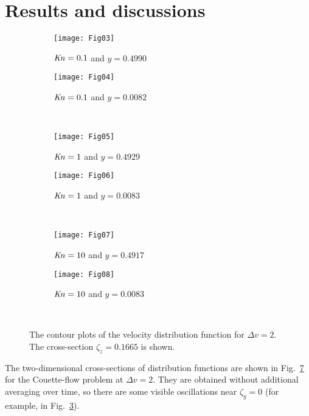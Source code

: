 \documentclass[]{jfm}
\newcommand{\Kn}{\mbox{\textit{Kn}}}
\begin{document}
\section{Results and discussions}

\begin{figure}
    \centering
    \begin{subfigure}[b]{.5\linewidth}
        \texttt{[image: Fig03]}
        \caption{\(\Kn=0.1\) and \(y=0.4990\)}
        \label{fig:distrib-kn0.1:boundary}
    \end{subfigure}%
    \begin{subfigure}[b]{.5\linewidth}
        \texttt{[image: Fig04]}
        \caption{\(\Kn=0.1\) and \(y=0.0082\)}
        \label{fig:distrib-kn0.1:center}
    \end{subfigure}\\
    \begin{subfigure}[b]{.5\linewidth}
        \texttt{[image: Fig05]}
        \caption{\(\Kn=1\) and \(y=0.4929\)}
        \label{fig:distrib-kn1.0:boundary}
    \end{subfigure}%
    \begin{subfigure}[b]{.5\linewidth}
        \texttt{[image: Fig06]}
        \caption{\(\Kn=1\) and \(y=0.0083\)}
        \label{fig:distrib-kn1.0:center}
    \end{subfigure}\\
    \begin{subfigure}[b]{.5\linewidth}
        \texttt{[image: Fig07]}
        \caption{\(\Kn=10\) and \(y=0.4917\)}
        \label{fig:distrib-kn10:boundary}
    \end{subfigure}%
    \begin{subfigure}[b]{.5\linewidth}
        \texttt{[image: Fig08]}
        \caption{\(\Kn=10\) and \(y=0.0083\)}
        \label{fig:distrib-kn10:center}
    \end{subfigure}\\
    \caption{The contour plots of the velocity distribution function for \(\Delta{v}=2\).
        The cross-section \(\zeta_z=0.1665\) is shown.}
    \label{fig:distrib}
\end{figure}

The two-dimensional cross-sections of distribution functions are shown
in Fig.~\ref{fig:distrib} for the Couette-flow problem at \(\Delta{v}=2\).
They are obtained without additional averaging over time,
so there are some visible oscillations near \(\zeta_y=0\)
(for example, in Fig.~\ref{fig:distrib-kn1.0:boundary}).
\end{document}
